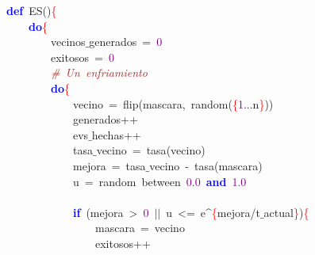 \noindent
\mbox{}\textbf{\textcolor{Blue}{def}}\ ES\textcolor{BrickRed}{()}\textcolor{Red}{\{} \\
\mbox{}\ \ \ \ \textbf{\textcolor{Blue}{do}}\textcolor{Red}{\{} \\
\mbox{}\ \ \ \ \ \ \ \ vecinos$\_$generados\ \textcolor{BrickRed}{=}\ \textcolor{Purple}{0} \\
\mbox{}\ \ \ \ \ \ \ \ exitosos\ \textcolor{BrickRed}{=}\ \textcolor{Purple}{0} \\
\mbox{}\ \ \ \ \ \ \ \ \textit{\textcolor{Brown}{\#\ Un\ enfriamiento}} \\
\mbox{}\ \ \ \ \ \ \ \ \textbf{\textcolor{Blue}{do}}\textcolor{Red}{\{} \\
\mbox{}\ \ \ \ \ \ \ \ \ \ \ \ vecino\ \textcolor{BrickRed}{=}\ flip\textcolor{BrickRed}{(}mascara\textcolor{BrickRed}{,}\ random\textcolor{BrickRed}{(}\textcolor{Red}{\{}\textcolor{Purple}{1}\textcolor{BrickRed}{...}n\textcolor{Red}{\}}\textcolor{BrickRed}{))} \\
\mbox{}\ \ \ \ \ \ \ \ \ \ \ \ generados\textcolor{BrickRed}{++} \\
\mbox{}\ \ \ \ \ \ \ \ \ \ \ \ evs$\_$hechas\textcolor{BrickRed}{++} \\
\mbox{}\ \ \ \ \ \ \ \ \ \ \ \ tasa$\_$vecino\ \textcolor{BrickRed}{=}\ tasa\textcolor{BrickRed}{(}vecino\textcolor{BrickRed}{)} \\
\mbox{}\ \ \ \ \ \ \ \ \ \ \ \ mejora\ \textcolor{BrickRed}{=}\ tasa$\_$vecino\ \textcolor{BrickRed}{-}\ tasa\textcolor{BrickRed}{(}mascara\textcolor{BrickRed}{)} \\
\mbox{}\ \ \ \ \ \ \ \ \ \ \ \ u\ \textcolor{BrickRed}{=}\ random\ between\ \textcolor{Purple}{0.0}\ \textbf{\textcolor{Blue}{and}}\ \textcolor{Purple}{1.0} \\
\mbox{} \\
\mbox{}\ \ \ \ \ \ \ \ \ \ \ \ \textbf{\textcolor{Blue}{if}}\ \textcolor{BrickRed}{(}mejora\ \textcolor{BrickRed}{\textgreater{}}\ \textcolor{Purple}{0}\ \textcolor{BrickRed}{$|$$|$}\ u\ \textcolor{BrickRed}{\textless{}=}\ e\textcolor{BrickRed}{\textasciicircum{}}\textcolor{Red}{\{}mejora\textcolor{BrickRed}{/}t$\_$actual\textcolor{Red}{\}}\textcolor{BrickRed}{)}\textcolor{Red}{\{} \\
\mbox{}\ \ \ \ \ \ \ \ \ \ \ \ \ \ \ \ mascara\ \textcolor{BrickRed}{=}\ vecino \\
\mbox{}\ \ \ \ \ \ \ \ \ \ \ \ \ \ \ \ exitosos\textcolor{BrickRed}{++} \\
